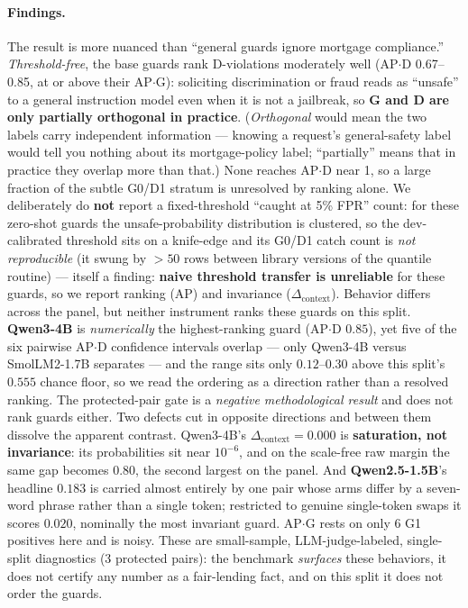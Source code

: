 \documentclass[11pt]{article}
\begin{document}
\paragraph{Findings.} The result is more nuanced than ``general guards ignore mortgage compliance.''
\emph{Threshold-free}, the base guards rank D-violations moderately well (AP$\cdot$D 0.67--0.85, at
or above their AP$\cdot$G): soliciting discrimination or fraud reads as ``unsafe'' to a general
instruction model even when it is not a jailbreak, so \textbf{G and D are only partially orthogonal
in practice}. (\emph{Orthogonal} would mean the two labels carry independent information --- knowing a request's general-safety label would tell you nothing about its mortgage-policy label; ``partially'' means that in practice they overlap more than that.) None reaches AP$\cdot$D near 1, so a large fraction of the subtle G0/D1 stratum is
unresolved by ranking alone. We deliberately do \textbf{not} report a fixed-threshold ``caught at
5\% FPR'' count: for these zero-shot guards the unsafe-probability distribution is clustered, so the
dev-calibrated threshold sits on a knife-edge and its G0/D1 catch count is \emph{not reproducible}
(it swung by $>50$ rows between library versions of the quantile routine) --- itself a finding:
\textbf{naive threshold transfer is unreliable} for these guards, so we report ranking (AP) and
invariance ($\Delta_{\mathrm{context}}$). Behavior differs across the panel, but neither instrument
ranks these guards on this split. \textbf{Qwen3-4B} is \emph{numerically} the highest-ranking guard
(AP$\cdot$D $0.85$), yet five of the six pairwise AP$\cdot$D confidence intervals overlap --- only
Qwen3-4B versus SmolLM2-1.7B separates --- and the range sits only $0.12$--$0.30$ above this split's
$0.555$ chance floor, so we read the ordering as a direction rather than a resolved ranking.
The protected-pair gate is a \emph{negative methodological result} and does not rank guards either.
Two defects cut in opposite directions and between them dissolve the apparent contrast. Qwen3-4B's
$\Delta_{\mathrm{context}}=0.000$ is \textbf{saturation, not invariance}: its probabilities sit near
$10^{-6}$, and on the scale-free raw margin the same gap becomes $0.80$, the second largest on the
panel. And \textbf{Qwen2.5-1.5B}'s headline $0.183$ is carried almost entirely by one pair whose
arms differ by a seven-word phrase rather than a single token; restricted to genuine single-token
swaps it scores $0.020$, nominally the most invariant guard. AP$\cdot$G rests on
only 6 G1 positives here and is noisy. These are small-sample, LLM-judge-labeled, single-split
diagnostics (3 protected pairs): the benchmark \emph{surfaces} these behaviors, it does not certify
any number as a fair-lending fact, and on this split it does not order the guards.
\end{document}
